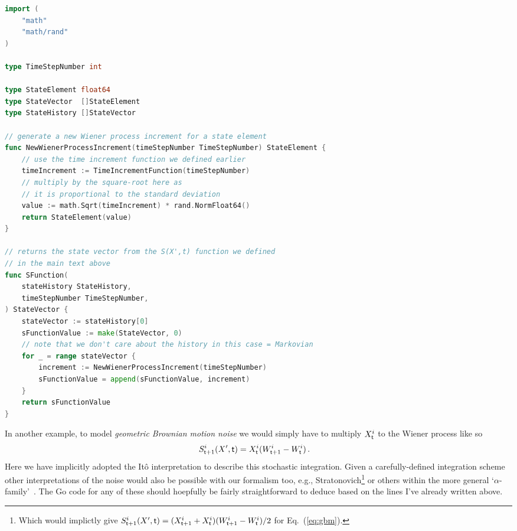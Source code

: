 \documentclass{book}
\begin{document}
\begin{lstlisting}[language=Go]
import (
    "math"
    "math/rand"
)

type TimeStepNumber int

type StateElement float64
type StateVector  []StateElement
type StateHistory []StateVector

// generate a new Wiener process increment for a state element
func NewWienerProcessIncrement(timeStepNumber TimeStepNumber) StateElement {
    // use the time increment function we defined earlier
    timeIncrement := TimeIncrementFunction(timeStepNumber)
    // multiply by the square-root here as 
    // it is proportional to the standard deviation
    value := math.Sqrt(timeIncrement) * rand.NormFloat64()
    return StateElement(value)
}

// returns the state vector from the S(X',t) function we defined 
// in the main text above
func SFunction(
    stateHistory StateHistory, 
    timeStepNumber TimeStepNumber,
) StateVector {
    stateVector := stateHistory[0]
    sFunctionValue := make(StateVector, 0)
    // note that we don't care about the history in this case = Markovian
    for _ = range stateVector {
        increment := NewWienerProcessIncrement(timeStepNumber)
        sFunctionValue = append(sFunctionValue, increment)
    }
    return sFunctionValue
}
\end{lstlisting}

In another example, to model \emph{geometric Brownian motion noise} we would simply have to multiply $X^i_{\sf t}$ to the Wiener process like so
\begin{align}
& S^{i}_{{\sf t}+1}(X',{\sf t}) = X^i_{\sf t}(W^i_{{\sf t}+1}-W^i_{\sf t})\label{eq:gbm} \,.
\end{align}
Here we have implicitly adopted the Itô interpretation to describe this stochastic integration. Given a carefully-defined integration scheme other interpretations of the noise would also be possible with our formalism too, e.g., Stratonovich\footnote{Which would implictly give $S^{i}_{{\sf t}+1}(X',{\sf t}) = (X^i_{{\sf t}+1}+X^i_{\sf t})(W^i_{{\sf t}+1}-W^i_{\sf t}) / 2$ for Eq.~(\ref{eq:gbm}).} or others within the more general `$\alpha$-family'~\cite{van1992stochastic,risken1996fokker,rog-will-2000}. The Go code for any of these should hoepfully be fairly straightforward to deduce based on the lines I've already written above.
\end{document}
